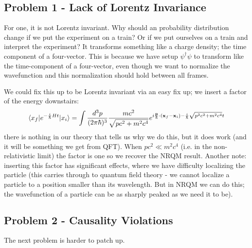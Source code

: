 \subsection{Problem 1 - Lack of Lorentz Invariance}
For one, it is not Lorentz invariant. Why should an probability distribution change if we put the experiment on a train? Or if we put ourselves on a train and interpret the experiment? It transforms something like a charge density; the time component of a four-vector. This is because we have setup $\psi^\dag\psi$ to transform like the time-component of a four-vector, even though we want to normalize the wavefunction and this normalization should hold between all frames.

We could fix this up to be Lorentz invariant via an easy fix up; we insert a factor of the energy downstairs:
\begin{equation}
    \langle x_f \rvert e^{-\frac{i}{\hbar}Ht}\lvert x_i \rangle = \int \frac{d^3p}{(2\pi\hbar)^3}\frac{mc^2}{\sqrt{pc^2 + m^2c^4}}e^{i\frac{\mathbf{p}}{\hbar}\cdot(\mathbf{x}_f - \mathbf{x}_i) -\frac{i}{\hbar}\sqrt{p^2c^2 + m^2c^4}t}
\end{equation}
there is nothing in our theory that tells us why we do this, but it does work (and it will be something we get from QFT). When $pc^2 \ll m^2c^4$ (i.e. in the non-relativistic limit) the factor is one so we recover the NRQM result. Another note: inserting this factor has significant effects, where we have difficulty localizing the particle (this carries through to quantum field theory - we cannot localize a particle to a position smaller than its wavelength. But in NRQM we can do this; the wavefunction of a particle can be as sharply peaked as we need it to be).

\subsection{Problem 2 - Causality Violations}
The next problem is harder to patch up.

